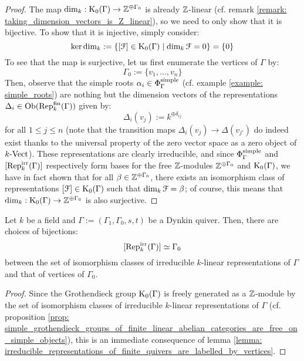                 \begin{proof}
                    The map $\dim_k: \mathrm{K}_0(\Gamma) \to \mathbb{Z}^{\oplus \Gamma_0}$ is already $\mathbb{Z}$-linear (cf. remark \ref{remark: taking_dimension_vectors_is_Z_linear}), so we need to only show that it is bijective. To show that it is injective, simply consider:
                        $$\ker \dim_k := \{[\mathcal{F}] \in \mathrm{K}_0(\Gamma) \mid \dim_k \mathcal{F} = 0\} = \{0\}$$
                    To see that the map is surjective, let us first enumerate the vertices of $\Gamma$ by:
                        $$\Gamma_0 := \{v_1, ..., v_n\}$$
                    Then, observe that the simple roots $\alpha_i \in \Phi_{\Gamma}^{\mathrm{simple}}$ (cf. example \ref{example: simple_roots}) are nothing but the dimension vectors of the representations $\Delta_i \in \mathrm{Ob}(\mathrm{Rep}_k^{\mathrm{fin}}(\Gamma))$ given by:
                        $$\Delta_i(v_j) := k^{\oplus \delta_{ij}}$$
                    for all $1 \leq j \leq n$ (note that the transition maps $\Delta_i(v_j) \to \Delta(v_{j'})$ do indeed exist thanks to the universal property of the zero vector space as a zero object of $k\text{-}\mathrm{Vect}$). These representations are clearly irreducible, and since $\Phi_{\Gamma}^{\mathrm{simple}}$ and $[\mathrm{Rep}_k^{\mathrm{irr}}(\Gamma)]$ respectively form bases for the free $\mathbb{Z}$-modules $\mathbb{Z}^{\oplus \Gamma_0}$ and $\mathrm{K}_0(\Gamma)$, we have in fact shown that for all $\beta \in \mathbb{Z}^{\oplus \Gamma_0}$, there exists an isomorphism class of representations $[\mathcal{F}] \in \mathrm{K}_0(\Gamma)$ such that $\dim_k \mathcal{F} = \beta$; of course, this means that $\dim_k: \mathrm{K}_0(\Gamma) \to \mathbb{Z}^{\oplus \Gamma_0}$ is also surjective.
                \end{proof}
            \begin{corollary} \label{coro: irreducible_representations_of_finite_quivers_are_labelled_by_vertices}
                Let $k$ be a field and $\Gamma := (\Gamma_1, \Gamma_0, s, t)$ be a Dynkin quiver. Then, there are choices of bijections:
                    $$[\mathrm{Rep}_k^{\mathrm{irr}}(\Gamma)] \simeq \Gamma_0$$
                between the set of isomorphism classes of irreducible $k$-linear representations of $\Gamma$ and that of vertices of $\Gamma_0$.
            \end{corollary}
                \begin{proof}
                    Since the Grothendieck group $\mathrm{K}_0(\Gamma)$ is freely generated as a $\mathbb{Z}$-module by the set of isomorphism classes of irreducible $k$-linear representations of $\Gamma$ (cf. proposition \ref{prop: simple_grothendieck_groups_of_finite_linear_abelian_categories_are_free_on_simple_objects}), this is an immediate consequence of lemma \ref{lemma: irreducible_representations_of_finite_quivers_are_labelled_by_vertices}.
                \end{proof}
